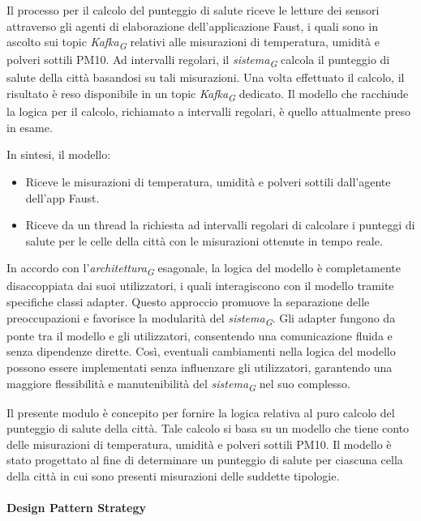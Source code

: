 Il processo per il calcolo del punteggio di salute riceve le letture dei sensori attraverso gli agenti di elaborazione dell'applicazione Faust, i quali sono in ascolto sui topic \textit{Kafka}\textsubscript{\textit{G}} relativi alle misurazioni di temperatura, umidità e polveri sottili PM10. Ad intervalli regolari, il \textit{sistema}\textsubscript{\textit{G}} calcola il punteggio di salute della città basandosi su tali misurazioni. Una volta effettuato il calcolo, il risultato è reso disponibile in un topic \textit{Kafka}\textsubscript{\textit{G}} dedicato.
Il modello che racchiude la logica per il calcolo, richiamato a intervalli regolari, è quello attualmente preso in esame.

In sintesi, il modello:
\begin{itemize}
    \item Riceve le misurazioni di temperatura, umidità e polveri sottili dall'agente dell'app Faust.
    \item Riceve da un thread la richiesta ad intervalli regolari di calcolare i punteggi di salute per le celle della città con le misurazioni ottenute in tempo reale.
\end{itemize}

In accordo con l'\textit{architettura}\textsubscript{\textit{G}} esagonale, la logica del modello è completamente disaccoppiata dai suoi utilizzatori, i quali interagiscono con il modello tramite specifiche classi adapter. Questo approccio promuove la separazione delle preoccupazioni e favorisce la modularità del \textit{sistema}\textsubscript{\textit{G}}. Gli adapter fungono da ponte tra il modello e gli utilizzatori, consentendo una comunicazione fluida e senza dipendenze dirette. Così, eventuali cambiamenti nella logica del modello possono essere implementati senza influenzare gli utilizzatori, garantendo una maggiore flessibilità e manutenibilità del \textit{sistema}\textsubscript{\textit{G}} nel suo complesso.

Il presente modulo è concepito per fornire la logica relativa al puro calcolo del punteggio di salute della città. Tale calcolo si basa su un modello che tiene conto delle misurazioni di temperatura, umidità e polveri sottili PM10. Il modello è stato progettato al fine di determinare un punteggio di salute per ciascuna cella della città in cui sono presenti misurazioni delle suddette tipologie.

\paragraph*{Design Pattern Strategy}

